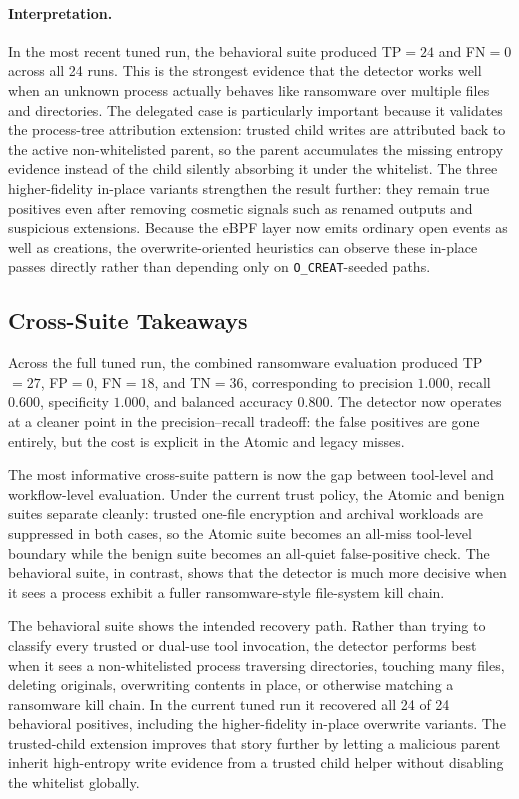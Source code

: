 \documentclass[twocolumn, 10pt]{scrartcl}
\begin{document}
\paragraph{Interpretation.}
In the most recent tuned run, the behavioral suite produced TP$=24$ and FN$=0$ across all 24 runs. This is the strongest evidence that the detector works well when an unknown process actually behaves like ransomware over multiple files and directories. The delegated case is particularly important because it validates the process-tree attribution extension: trusted child writes are attributed back to the active non-whitelisted parent, so the parent accumulates the missing entropy evidence instead of the child silently absorbing it under the whitelist. The three higher-fidelity in-place variants strengthen the result further: they remain true positives even after removing cosmetic signals such as renamed outputs and suspicious extensions. Because the eBPF layer now emits ordinary open events as well as creations, the overwrite-oriented heuristics can observe these in-place passes directly rather than depending only on \texttt{O\_CREAT}-seeded paths.

\subsection{Cross-Suite Takeaways}
Across the full tuned run, the combined ransomware evaluation produced TP$=27$, FP$=0$, FN$=18$, and TN$=36$, corresponding to precision $1.000$, recall $0.600$, specificity $1.000$, and balanced accuracy $0.800$. The detector now operates at a cleaner point in the precision--recall tradeoff: the false positives are gone entirely, but the cost is explicit in the Atomic and legacy misses.

The most informative cross-suite pattern is now the gap between tool-level and workflow-level evaluation. Under the current trust policy, the Atomic and benign suites separate cleanly: trusted one-file encryption and archival workloads are suppressed in both cases, so the Atomic suite becomes an all-miss tool-level boundary while the benign suite becomes an all-quiet false-positive check. The behavioral suite, in contrast, shows that the detector is much more decisive when it sees a process exhibit a fuller ransomware-style file-system kill chain.

The behavioral suite shows the intended recovery path. Rather than trying to classify every trusted or dual-use tool invocation, the detector performs best when it sees a non-whitelisted process traversing directories, touching many files, deleting originals, overwriting contents in place, or otherwise matching a ransomware kill chain. In the current tuned run it recovered all 24 of 24 behavioral positives, including the higher-fidelity in-place overwrite variants. The trusted-child extension improves that story further by letting a malicious parent inherit high-entropy write evidence from a trusted child helper without disabling the whitelist globally.
\end{document}
